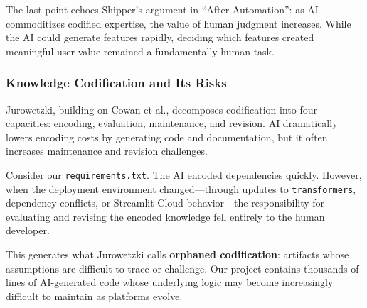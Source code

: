 The last point echoes Shipper's argument in ``After Automation''\parencite{shipper2026after}: as AI commoditizes codified expertise, the value of human judgment increases. While the AI could generate features rapidly, deciding which features created meaningful user value remained a fundamentally human task.

\subsubsection{Knowledge Codification and Its Risks}

Jurowetzki\parencite{Jurowetzki2026}, building on Cowan et al.\parencite{cowan2000codification}, decomposes codification into four capacities: encoding, evaluation, maintenance, and revision. AI dramatically lowers encoding costs by generating code and documentation, but it often increases maintenance and revision challenges.

Consider our \texttt{requirements.txt}. The AI encoded dependencies quickly. However, when the deployment environment changed---through updates to \texttt{transformers}, dependency conflicts, or Streamlit Cloud behavior---the responsibility for evaluating and revising the encoded knowledge fell entirely to the human developer.

This generates what Jurowetzki calls \textbf{orphaned codification}: artifacts whose assumptions are difficult to trace or challenge. Our project contains thousands of lines of AI-generated code whose underlying logic may become increasingly difficult to maintain as platforms evolve.




